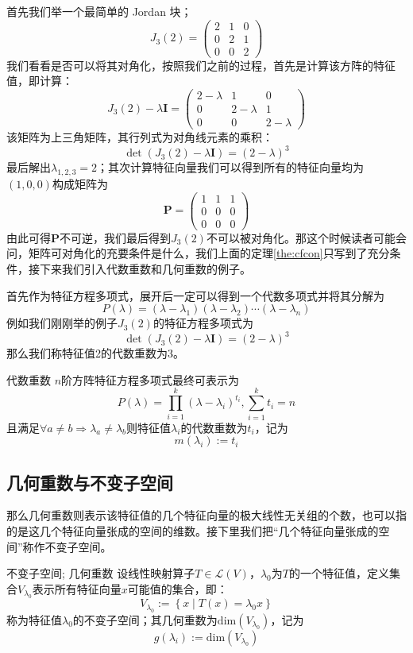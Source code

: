 首先我们举一个最简单的 Jordan 块；
$$
J_3(2)=\begin{pmatrix}
 2 & 1 & 0\\
 0 & 2 & 1\\
 0 & 0 & 2
\end{pmatrix}
$$
我们看看是否可以将其对角化，按照我们之前的过程，首先是计算该方阵的特征值，即计算：
$$
J_3(2) - \lambda \mathbf{I} = \begin{pmatrix} 2-\lambda & 1 & 0 \\ 0 & 2-\lambda & 1 \\ 0 & 0 & 2-\lambda \end{pmatrix}
$$
该矩阵为上三角矩阵，其行列式为对角线元素的乘积：$$\det(J_3(2) - \lambda \mathbf{I}) = (2-\lambda)^3$$最后解出$\lambda_{1,2,3}=2$；其次计算特征向量我们可以得到所有的特征向量均为$(1,0,0)$构成矩阵为$$\mathbf{P}=\begin{pmatrix}
 1 & 1 & 1\\
 0 & 0 & 0\\
 0 & 0 & 0
\end{pmatrix}$$由此可得$\mathbf{P}$不可逆，我们最后得到$J_3(2)$不可以被对角化。那这个时候读者可能会问，矩阵可对角化的充要条件是什么，我们上面的定理\ref{the:cfcon}只写到了充分条件，接下来我们引入代数重数和几何重数的例子。

首先作为特征方程多项式，展开后一定可以得到一个代数多项式并将其分解为
$$
P(\lambda) = (\lambda - \lambda_1)(\lambda - \lambda_2) \cdots (\lambda - \lambda_n)
$$
例如我们刚刚举的例子$J_3(2)$的特征方程多项式为$$\det(J_3(2) - \lambda \mathbf{I}) = (2-\lambda)^3$$那么我们称特征值2的代数重数为3。

\begin{definition}{代数重数}
	$n$阶方阵特征方程多项式最终可表示为$$P(\lambda)=\prod_{i=1}^{k} (\lambda-\lambda_i)^{t_i},\sum_{i=1}^{k}t_i=n$$且满足$\forall a\neq b\Longrightarrow\lambda_a\neq\lambda_b$则特征值$\lambda_i$的代数重数为$t_i$，记为$$m(\lambda_i):=t_i$$
\end{definition}

\subsection{几何重数与不变子空间}

那么几何重数则表示该特征值的几个特征向量的极大线性无关组的个数，也可以指的是这几个特征向量张成的空间的维数。接下里我们把``几个特征向量张成的空间''称作不变子空间。

\begin{definition}{不变子空间; 几何重数}
	设线性映射算子$T\in \mathcal{L}(V)$，$\lambda_0$为$T$的一个特征值，定义集合$V_{\lambda_0}$表示所有特征向量$x$可能值的集合，即：$$V_{\lambda_0}:=\left\{ x\mid T(x)=\lambda_0 x \right\}$$称为特征值$\lambda_0$的不变子空间；其几何重数为$\text{dim}\left( V_{\lambda_0} \right)$，记为$$g(\lambda_i):=\text{dim}\left( V_{\lambda_0} \right)$$
\end{definition}

